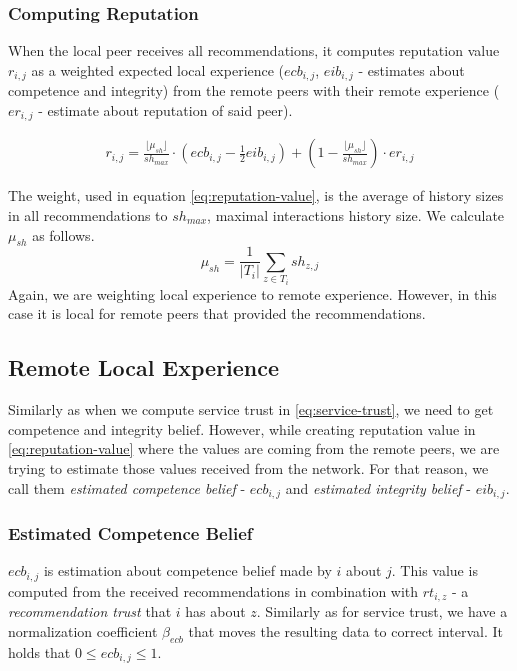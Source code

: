 
\subsubsection{Computing Reputation}
When the local peer receives all recommendations, it computes reputation value $r_{i,j}$ as a weighted expected local experience ($ecb_{i,j}$, $eib_{i,j}$ - estimates about competence and integrity) from the remote peers with their remote experience ($er_{i,j}$ - estimate about reputation of said peer).

\begin{equation}
\label{eq:reputation-value}
\begin{split}
    r_{i, j}=\frac{\lfloor\mu_{sh}\rfloor}{sh_{max}} \cdot \left(ecb_{i,j}-\frac{1}{2} eib_{i, j}\right) + \left(1-\frac{\lfloor\mu_{sh}\rfloor}{sh_{max}}\right) \cdot er_{i,j}
\end{split}
\end{equation}

\noindent
The weight, used in equation \ref{eq:reputation-value}, is the average of history sizes in all recommendations to $sh_{max}$, maximal interactions history size. 
We calculate $\mu_{sh}$ as follows.
\begin{equation}
    \mu_{sh} = \frac{1}{|T_{i}|} \sum_{z \in T_{i}} sh_{z, j}
\end{equation}
\noindent
Again, we are weighting local experience to remote experience. However, in this case it is local for remote peers that provided the recommendations.

\subsection{Remote Local Experience}
\label{subsec:remote-local-experience}
Similarly as when we compute service trust in \ref{eq:service-trust}, we need to get competence and integrity belief.
However, while creating reputation value in \ref{eq:reputation-value} where the values are coming from the remote peers, we are trying to estimate those values received from the network.
For that reason, we call them \textit{estimated competence belief} - $ecb_{i,j}$ and \textit{estimated integrity belief} - $eib_{i,j}$.

\subsubsection{Estimated Competence Belief}
$ecb_{i,j}$ is estimation about competence belief made by $i$ about $j$. 
This value is computed from the received recommendations in combination with $rt_{i,z}$ - a \textit{recommendation trust} that $i$ has about $z$.
Similarly as for service trust, we have a normalization coefficient $\beta_{ecb}$ that moves the resulting data to correct interval.
It holds that $0 \leq ecb_{i,j} \leq 1$.

